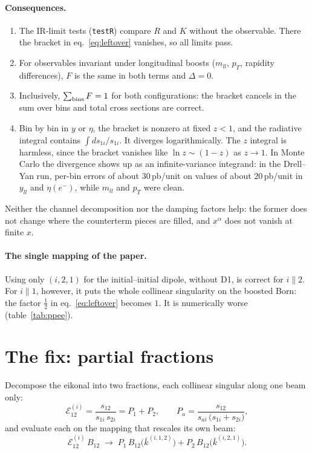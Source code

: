 \documentclass[11pt,a4paper]{article}
\newcommand{\kb}{\bar k}
\newcommand{\E}{\mathcal E}
\begin{document}
\paragraph{Consequences.}
\begin{enumerate}
\item The IR-limit tests (\texttt{testR}) compare $R$ and $K$ without the
      observable. There the bracket in eq.~\eqref{eq:leftover} vanishes, so
      all limits pass.
\item For observables invariant under longitudinal boosts ($m_{ll}$, $p_T$,
      rapidity differences), $F$ is the same in both terms and $\Delta=0$.
\item Inclusively, $\sum_{\rm bins}F=1$ for both configurations: the bracket
      cancels in the sum over bins and total cross sections are correct.
\item Bin by bin in $y$ or $\eta$, the bracket is nonzero at fixed $z<1$, and
      the radiative integral contains $\int ds_{1i}/s_{1i}$. It diverges
      logarithmically. The $z$ integral is harmless, since the bracket vanishes
      like $\ln z\sim(1-z)$ as $z\to1$. In Monte Carlo the divergence shows up
      as an infinite-variance integrand: in the Drell--Yan run, per-bin errors
      of about $30$\,pb/unit on values of about $20$\,pb/unit in $y_{ll}$ and
      $\eta(e^-)$, while $m_{ll}$ and $p_T$ were clean.
\end{enumerate}
Neither the channel decomposition nor the damping factors help: the former
does not change where the counterterm pieces are filled, and $x^\alpha$ does not
vanish at finite $x$.

\paragraph{The single mapping of the paper.}
Using only $(i,2,1)$ for the initial--initial dipole, without D1, is correct
for $i\parallel2$. For $i\parallel1$, however, it puts the whole collinear
singularity on the boosted Born: the factor $\frac12$ in
eq.~\eqref{eq:leftover} becomes $1$. It is numerically worse
(table~\ref{tab:ppee}).

\section{The fix: partial fractions}

Decompose the eikonal into two fractions, each collinear singular along one
beam only:
\begin{equation}
  \E^{(i)}_{12} = \frac{s_{12}}{s_{1i}\,s_{2i}} = P_1 + P_2,
  \qquad
  P_a = \frac{s_{12}}{s_{ai}\,\big(s_{1i}+s_{2i}\big)} ,
  \label{eq:pf}
\end{equation}
and evaluate each on the mapping that rescales its own beam:
\begin{equation}
  \E^{(i)}_{12}\,B_{12} \;\longrightarrow\;
  P_1\,B_{12}\big(\kb^{(i,1,2)}\big) + P_2\,B_{12}\big(\kb^{(i,2,1)}\big).
  \label{eq:new}
\end{equation}
\end{document}
